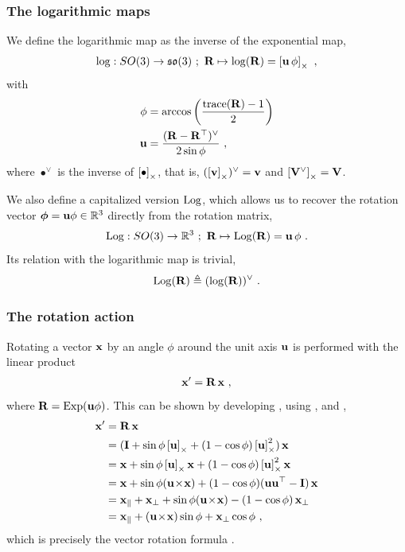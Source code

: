 \subsubsection{The logarithmic maps}

We define the logarithmic map as the inverse of the exponential map,
%
\begin{align}
\log : SO(3)\to{\mathfrak {so}}(3)~;~ {\bf R} \mapsto \log({\bf R})=\left[{\bf u}\,\phi\right]_\times
~,
\end{align}
%
with
%
\begin{align}
\phi &= \arccos\left(\frac{\operatorname*{trace}({\bf R})-1}{2}\right) 
\\
{\bf u} &= \frac{({\bf R}-{\bf R}^{\top})^\vee}{2\sin\phi} 
~,
\end{align}
%
where $\bullet^\vee$ is the inverse of $\left[\bullet\right]_\times$, that is, $(\left[{\bf v}\right]_\times)^\vee={\bf v}$ and $\left[{\bf V}^\vee\right]_\times={\bf V}$.

We also define a capitalized version $\operatorname*{Log}$, which allows us to recover the rotation vector ${\bm \phi}={\bf u}\phi\in{\mathbb R}^3$ directly from the rotation matrix, 
%
\begin{subequations}
\begin{align}
\operatorname*{Log}: SO(3) \to {\mathbb R}^3 ~;~ {\bf R}\mapsto\operatorname*{Log}({\bf R}) = {\bf u}\,\phi 
~.
\end{align}
\end{subequations}
%
Its relation with the logarithmic map is trivial,
%
\begin{align}
\operatorname*{Log}({\bf R}) \triangleq (\log({\bf R}))^\vee
~.
\end{align}



\subsubsection{The rotation action}

Rotating a vector ${\bf x}$ by an angle $\phi$ around the unit axis ${\bf u}$ %
is performed with the linear product
%
\begin{align}
{\bf x}'={\bf R}\,{\bf x}
~, 
\label{equ:rotWithMat}
\end{align}
%
where ${\bf R}=\operatorname*{Exp}({\bf u}\phi)$.
This can be shown by developing , 
using ,  and , 
%
\begin{align}
\begin{split}
{\bf x}' &= {\bf R}\,{\bf x}  \\
&= ({\bf I} + \sin\phi\left[{\bf u}\right]_\times + (1-\cos\phi)\left[{\bf u}\right]_\times^2)\,{\bf x}  \\
&= {\bf x} + \sin\phi\left[{\bf u}\right]_\times{\bf x} + (1-\cos\phi)\left[{\bf u}\right]_\times^2{\bf x}  \\
&= {\bf x} + \sin\phi({\bf u}\!\times\!{\bf x}) + (1-\cos\phi)({\bf u}{\bf u}^{\top}-{\bf I})\,{\bf x}  \\
&= {\bf x}_\| + {\bf x}_\bot + \sin\phi({\bf u}\!\times\!{\bf x}) - (1-\cos\phi)\,{\bf x}_\bot  \\
&= {\bf x}_\| + ({\bf u}\!\times\!{\bf x})\sin\phi + {\bf x}_\bot\cos\phi
~,
\end{split}
\end{align}%
%
which is precisely the vector rotation formula .


